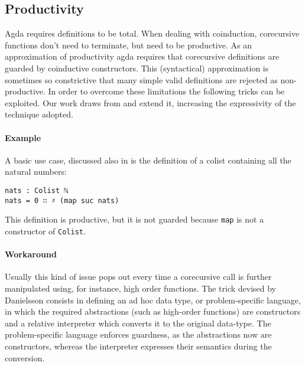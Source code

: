 \documentclass[10pt,a4paper]{article}
\begin{document}
\subsection{Productivity}
\label{sec:Productivity}
Agda requires definitions to be total. When dealing with coinduction, corecursive functions don't need to terminate, but need to be productive.
As an approximation of productivity agda requires that corecursive definitions are guarded by coinductive constructors. This (syntactical) approximation is sometimes so constrictive that many simple valid definitions are rejected as non-productive. In order to overcome these limitations the following tricks can be exploited. Our work draws from \cite{DAN10} and extend it, increasing 
the expressivity of the technique adopted.

\paragraph{Example}
A basic use case, discussed also in \cite{DAN10} is the definition of a colist
containing all the natural numbers:
\begin{verbatim}
nats : Colist ℕ
nats = 0 ∷ ♯ (map suc nats)
\end{verbatim}
This definition is productive, but it is not guarded because \texttt{map} is not a constructor of \texttt{Colist}. 

\paragraph{Workaround}
Usually this kind of issue pops out every time a corecursive call is further manipulated using, for instance, high order functions.
The trick devised by Danielsson consists in defining an ad hoc data type, or problem-specific language, in which the required abstractions (such as high-order functions) are constructors and a relative interpreter which converts it to the original data-type.
The problem-specific language enforces guardness, as the abstractions now are constructors, whereas the interpreter expresses their semantics during the conversion.
\end{document}
